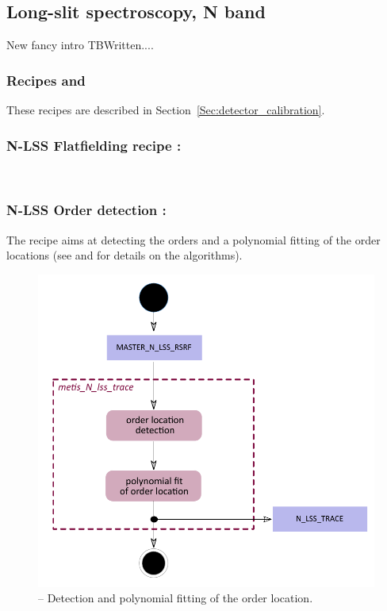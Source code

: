 \clearpage
\subsection{Long-slit spectroscopy, N band}
\label{ssec:recipes_lss_n}
New fancy intro TBWritten....

\subsubsection{Recipes  and }
These recipes are described in Section~\ref{Sec:detector_calibration}.

\subsubsection{N-LSS Flatfielding recipe :}\label{rec:lssNflat}
\\

\clearpage
\subsubsection{N-LSS Order detection :}\label{rec:lssNtrace}
The recipe  aims at detecting the orders and a polynomial fitting of the order locations (see \cite{pis02} and \cite{pis21} for details on the algorithms).

\begin{figure}[ht]
  \centering
  \includegraphics[width=0.5\textheight]{figures/metis_N_lss_trace_v0.71.pdf}
  \caption[Recipe: ]{ --
    Detection and polynomial fitting of the order location.}
  \label{Fig:rec_N_lss_wave}
\end{figure}


